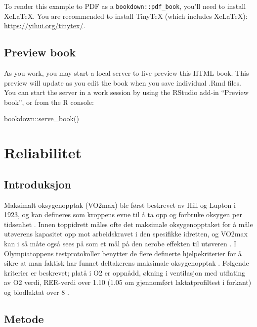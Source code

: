 \documentclass[
]{book}
\newenvironment{Shaded}{\begin{snugshade}}{\end{snugshade}}
\newcommand{\FunctionTok}[1]{\textcolor[rgb]{0.00,0.00,0.00}{#1}}
\newcommand{\NormalTok}[1]{#1}
\newcommand{\SpecialCharTok}[1]{\textcolor[rgb]{0.00,0.00,0.00}{#1}}
\begin{document}
To render this example to PDF as a \texttt{bookdown::pdf\_book}, you'll need to install XeLaTeX. You are recommended to install TinyTeX (which includes XeLaTeX): \url{https://yihui.org/tinytex/}.

\hypertarget{preview-book}{%
\section{Preview book}\label{preview-book}}

As you work, you may start a local server to live preview this HTML book. This preview will update as you edit the book when you save individual .Rmd files. You can start the server in a work session by using the RStudio add-in ``Preview book'', or from the R console:

\begin{Shaded}
\begin{Highlighting}[]
\NormalTok{bookdown}\SpecialCharTok{::}\FunctionTok{serve\_book}\NormalTok{()}
\end{Highlighting}
\end{Shaded}

\hypertarget{reliabilitet}{%
\chapter{Reliabilitet}\label{reliabilitet}}

\hypertarget{introduksjon}{%
\section{Introduksjon}\label{introduksjon}}

Maksimalt oksygenopptak (VO2max) ble først beskrevet av Hill og Lupton i 1923, og kan defineres som kroppens evne til å ta opp og forbruke oksygen per tidsenhet \citep{bassett2000, hill1923}. Innen toppidrett måles ofte det maksimale oksygenopptaket for å måle utøverens kapasitet opp mot arbeidskravet i den spesifikke idretten, og VO2max kan i så måte også sees på som et mål på den aerobe effekten til utøveren \citep{bassett2000}. I Olympiatoppens testprotokoller benytter de flere definerte hjelpekriterier for å sikre at man faktisk har funnet deltakerens maksimale oksygenopptak \citep{tønnessen2017}. Følgende kriterier er beskrevet; platå i O2 er oppnådd, økning i ventilasjon med utflating av O2 verdi, RER-verdi over 1.10 (1.05 om gjennomført laktatprofiltest i forkant) og blodlaktat over 8 \citep{tønnessen2017}.

\hypertarget{metode}{%
\section{Metode}\label{metode}}
\end{document}
